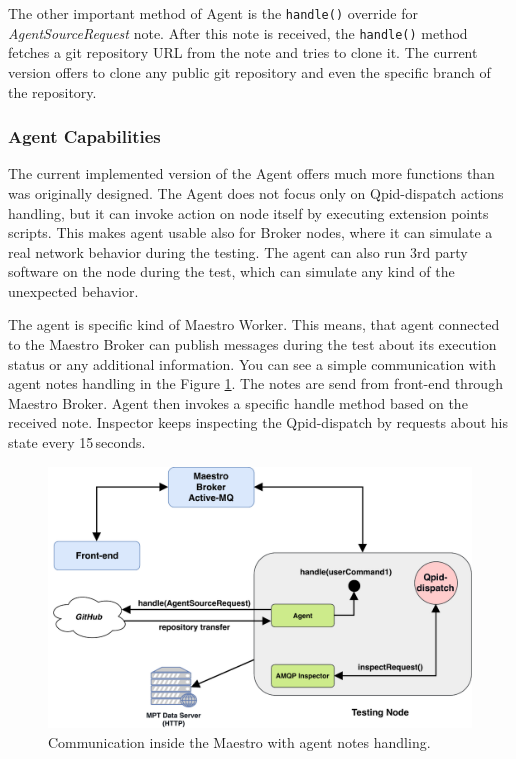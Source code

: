 The other important method of Agent is the \texttt{handle()} override for \emph{AgentSourceRequest} note. After this note is received, the \texttt{handle()} method fetches a git repository URL from the note and tries to clone it. The current version offers to clone any public git repository and even the specific branch of the repository.

\subsubsection*{Agent Capabilities}
\label{Agent Capabilities}
The current implemented version of the Agent offers much more functions than was originally designed. The Agent does not focus only on Qpid-dispatch actions handling, but it can invoke action on node itself by executing extension points scripts. This makes agent usable also for Broker nodes, where it can simulate a real network behavior during the testing. The agent can also run 3rd party software on the node during the test, which can simulate any kind of  the unexpected behavior.

The agent is specific kind of Maestro Worker. This means, that agent connected to the Maestro Broker can publish messages during the test about its execution status or any additional information. You can see a simple communication with agent notes handling in the Figure \ref{fig:agent_demo}. The notes are send from front-end through Maestro Broker. Agent then invokes a specific handle method based on the received note. Inspector keeps inspecting the Qpid-dispatch by requests about his state every 15\,seconds.

\begin{figure}[H]
  \centering
  \includegraphics[width=15cm]{obrazky-figures/agent_demo.pdf}
  \caption{Communication inside the Maestro with agent notes handling.}
  \label{fig:agent_demo}
\end{figure}

